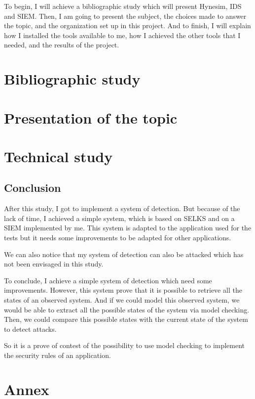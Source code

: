 \documentclass[a4paper, 11pt, oneside, oldfontcommands]{memoir}
\newcounter{th}[chapter]
\begin{document}
To begin, I will achieve a bibliographic study which will present Hynesim, IDS and SIEM. Then, I am going to
present the subject, the choices made to answer the topic, and the organization set up in this project. And to
finish, I will explain how I installed the tools available to me, how I achieved the other tools that I needed, and
the results of the project.

\newpage


\part{Bibliographic study}
  
  
  

  \part{Presentation of the topic}
  \label{part:2}
  
  
  

\part{Technical study}
  
  
  




\chapter*{Conclusion}


After this study, I got to implement a system of detection. But because of the lack of time, I achieved a simple
system, which is based on SELKS and on a SIEM implemented by me. This system is adapted to the application used for
the tests but it needs some improvements to be adapted for other applications.

We can also notice that my system of detection can also be attacked which has not been envisaged in this study.

To conclude, I achieve a simple system of detection which need some improvements. However, this system prove that
it is possible to retrieve all the states of an observed system. And if we could model this observed system, we
would be able to extract all the possible states of the system via model checking. Then, we could compare this
possible states with the current state of the system to detect attacks.

So it is a prove of contest of the possibility to use model checking to implement the security rules of an
application.




\newpage


\part*{Annex}
\appendix
\nocite{*}

\newpage
 \listoffigures
 \printindex
 
  
\end{document}
